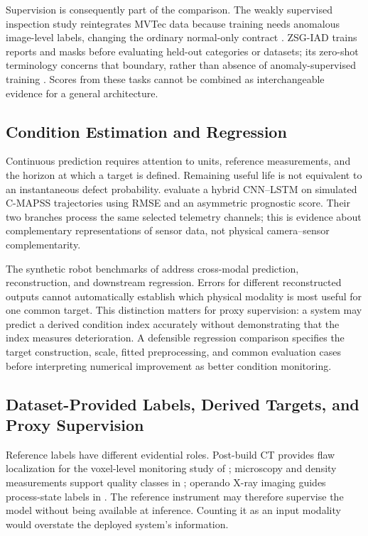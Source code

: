 Supervision is consequently part of the comparison. The weakly supervised inspection study reintegrates MVTec data because training needs anomalous image-level labels, changing the ordinary normal-only contract \citep[PDF p.~8]{P035}. ZSG-IAD trains reports and masks before evaluating held-out categories or datasets; its zero-shot terminology concerns that boundary, rather than absence of anomaly-supervised training \citep[PDF pp.~6, 8--9]{P025}. Scores from these tasks cannot be combined as interchangeable evidence for a general architecture.

\subsection{Condition Estimation and Regression}

Continuous prediction requires attention to units, reference measurements, and the horizon at which a target is defined. Remaining useful life is not equivalent to an instantaneous defect probability. \citet{AlDulaimi2019A} evaluate a hybrid CNN--LSTM on simulated C-MAPSS trajectories using RMSE and an asymmetric prognostic score. Their two branches process the same selected telemetry channels; this is evidence about complementary representations of sensor data, not physical camera--sensor complementarity.

The synthetic robot benchmarks of \citet{Altinses2025Performance} address cross-modal prediction, reconstruction, and downstream regression. Errors for different reconstructed outputs cannot automatically establish which physical modality is most useful for one common target. This distinction matters for proxy supervision: a system may predict a derived condition index accurately without demonstrating that the index measures deterioration. A defensible regression comparison specifies the target construction, scale, fitted preprocessing, and common evaluation cases before interpreting numerical improvement as better condition monitoring.

\subsection{Dataset-Provided Labels, Derived Targets, and Proxy Supervision}

Reference labels have different evidential roles. Post-build CT provides flaw localization for the voxel-level monitoring study of \citet{Petrich2021Multimodal}; microscopy and density measurements support quality classes in \citet{Li2022A}; operando X-ray imaging guides process-state labels in \citet{Pandiyan2022Deep}. The reference instrument may therefore supervise the model without being available at inference. Counting it as an input modality would overstate the deployed system's information.


